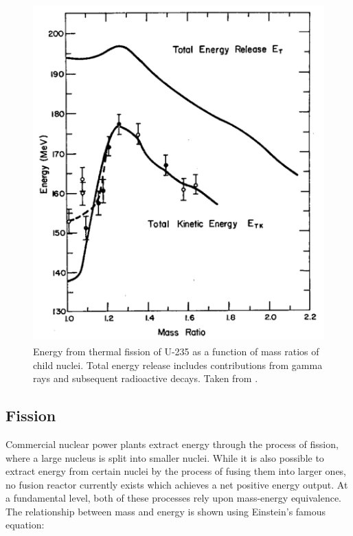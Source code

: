 \begin{figure}[htp]
\centering
\includegraphics[height=13cm]{images/fission_energy_total.png}
\caption[Energy from thermal fission of U-235 as a function of mass ratios of child nuclei. Total energy release includes contributions from gamma rays and subsequent radioactive decays.]{Energy from thermal fission of U-235 as a function of mass ratios of child nuclei. Total energy release includes contributions from gamma rays and subsequent radioactive decays. Taken from \cite{aras1965ranges}.}
\label{figure:fissionenergy}
\end{figure}

\subsection{Fission} %

Commercial nuclear power plants extract energy through the process of fission, where a large nucleus is split into smaller nuclei. While it is also possible to extract energy from certain nuclei by the process of fusing them into larger ones, no fusion reactor currently exists which achieves a net positive energy output. At a fundamental level, both of these processes rely upon mass-energy equivalence. The relationship between mass and energy is shown using Einstein's famous equation:

